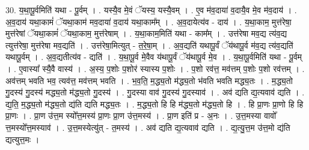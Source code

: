 \documentclass[17pt]{extarticle}
\begin{document}
30. य॒था॒पू॒र्वमिति॑ यथा - पू॒र्वम् । . यस्यै॒व मे॒वं ॅयस्य॒ यस्यै॒वम् । . ए॒व म॑व॒दाया॑ व॒दायै॒व मे॒व म॑व॒दाय॑ । . अ॒व॒दाय॑ यथा॒कामं॑ ॅयथा॒काम॑ मव॒दाया॑ व॒दाय॑ यथा॒काम᳚म् । . अ॒व॒दायेत्य॑व - दाय॑ । . य॒था॒काम॒ मुत्त॑रेषा॒ मुत्त॑रेषां ॅयथा॒कामं॑ ॅयथा॒काम॒ मुत्त॑रेषाम् । . य॒था॒काम॒मिति॑ यथा - काम᳚म् । . उत्त॑रेषा मव॒द्य त्य॑व॒द्य त्युत्त॑रेषा॒ मुत्त॑रेषा मव॒द्यति॑ । . उत्त॑रेषा॒मित्युत् - त॒रे॒षा॒म् । . अ॒व॒द्यति॑ यथापू॒र्वं ॅय॑थापू॒र्व म॑व॒द्य त्य॑व॒द्यति॑ यथापू॒र्वम् । . अ॒व॒द्यतीत्य॑व - द्यति॑ । . य॒था॒पू॒र्व मे॒वैव य॑थापू॒र्वं ॅय॑थापू॒र्व मे॒व । . य॒था॒पू॒र्वमिति॑ यथा - पू॒र्वम् । . ए॒वास्या᳚ स्यै॒वै वास्य॑ । . अ॒स्य॒ प॒शोः प॒शोर॑ स्यास्य प॒शोः । . प॒शो रव॑त्त॒ मव॑त्तम् प॒शोः प॒शो रव॑त्तम् । . अव॑त्तम् भवति भव॒ त्यव॑त्त॒ मव॑त्तम् भवति । . भ॒व॒ति॒ म॒द्ध्य॒तो म॑द्ध्य॒तो भ॑वति भवति मद्ध्य॒तः । . म॒द्ध्य॒तो गु॒दस्य॑ गु॒दस्य॑ मद्ध्य॒तो म॑द्ध्य॒तो गु॒दस्य॑ । . गु॒दस्या वाव॑ गु॒दस्य॑ गु॒दस्याव॑ । . अव॑ द्यति द्य॒त्यवाव॑ द्यति । . द्य॒ति॒ म॒द्ध्य॒तो म॑द्ध्य॒तो द्य॑ति द्यति मद्ध्य॒तः । . म॒द्ध्य॒तो हि हि म॑द्ध्य॒तो म॑द्ध्य॒तो हि । . हि प्रा॒णः प्रा॒णो हि हि प्रा॒णः । . प्रा॒ण उ॑त्त॒म स्यो᳚त्त॒मस्य॑ प्रा॒णः प्रा॒ण उ॑त्त॒मस्य॑ । . प्रा॒ण इति॑ प्र - अ॒नः । . उ॒त्त॒मस्या वावो᳚ त्त॒मस्यो᳚त्त॒मस्याव॑ । . उ॒त्त॒मस्येत्यु॑त् - त॒मस्य॑ । . अव॑ द्यति द्य॒त्यवाव॑ द्यति । . द्य॒त्यु॒त्त॒म उ॑त्त॒मो द्य॑ति द्यत्युत्त॒मः । \newline
\end{document}
